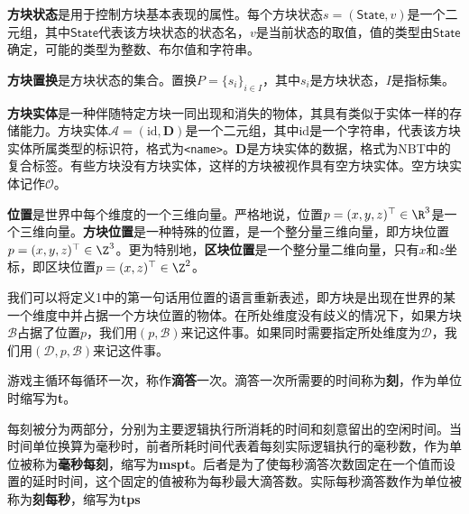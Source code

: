 \documentclass[a4,11pt]{aleph-notas}
\begin{document}
\begin{defi}
    \textbf{方块状态}是用于控制方块基本表现的属性。每个方块状态$s=(\mathsf{State},v)$是一个二元组，其中$\mathsf{State}$代表该方块状态的状态名，$v$是当前状态的取值，值的类型由$\mathsf{State}$确定，可能的类型为整数、布尔值和字符串。
\end{defi}

\begin{defi}
    \textbf{方块置换}是方块状态的集合。置换$P=\{s_i\}_{i\in I}$，其中$s_i$是方块状态，$I$是指标集。
\end{defi}

\begin{defi}
    \textbf{方块实体}是一种伴随特定方块一同出现和消失的物体，其具有类似于实体一样的存储能力。方块实体$\mathcal{A}=(\mathrm{id},\mathbf{D})$是一个二元组，其中$\mathrm{id}$是一个字符串，代表该方块实体所属类型的标识符，格式为\texttt{<name>}。$\mathbf{D}$是方块实体的数据，格式为NBT中的复合标签。有些方块没有方块实体，这样的方块被视作具有空方块实体。空方块实体记作$\mathcal{O}$。
\end{defi}

\begin{defi}[位置 position]
    \textbf{位置}是世界中每个维度的一个三维向量。严格地说，位置$p=(x,y,z)^\top\in\R^3$是一个三维向量。\textbf{方块位置}是一种特殊的位置，是一个整分量三维向量，即方块位置$p=(x,y,z)^\top\in\Z^3$。更为特别地，\textbf{区块位置}是一个整分量二维向量，只有$x$和$z$坐标，即区块位置$p=(x,z)^\top\in\Z^2$。
\end{defi}

我们可以将定义1中的第一句话用位置的语言重新表述，即方块是出现在世界的某一个维度中并占据一个方块位置的物体。在所处维度没有歧义的情况下，如果方块$\mathcal{B}$占据了位置$p$，我们用$(p,\mathcal{B})$来记这件事。如果同时需要指定所处维度为$\mathcal{D}$，我们用$(\mathcal{D},p,\mathcal{B})$来记这件事。

\begin{defi}[滴答 ticking]
    游戏主循环每循环一次，称作\textbf{滴答}一次。滴答一次所需要的时间称为\textbf{刻}，作为单位时缩写为\textbf{t}。
\end{defi}

每刻被分为两部分，分别为主要逻辑执行所消耗的时间和刻意留出的空闲时间。当时间单位换算为毫秒时，前者所耗时间代表着每刻实际逻辑执行的毫秒数，作为单位被称为\textbf{毫秒每刻}，缩写为\textbf{mspt}。后者是为了使每秒滴答次数固定在一个值而设置的延时时间，这个固定的值被称为每秒最大滴答数。实际每秒滴答数作为单位被称为\textbf{刻每秒}，缩写为\textbf{tps}
\end{document}
